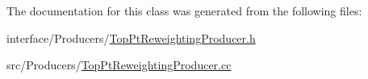 The documentation for this class was generated from the following files:\begin{DoxyCompactItemize}
\item 
interface/Producers/\hyperlink{TopPtReweightingProducer_8h}{TopPtReweightingProducer.h}\item 
src/Producers/\hyperlink{TopPtReweightingProducer_8cc}{TopPtReweightingProducer.cc}\end{DoxyCompactItemize}
